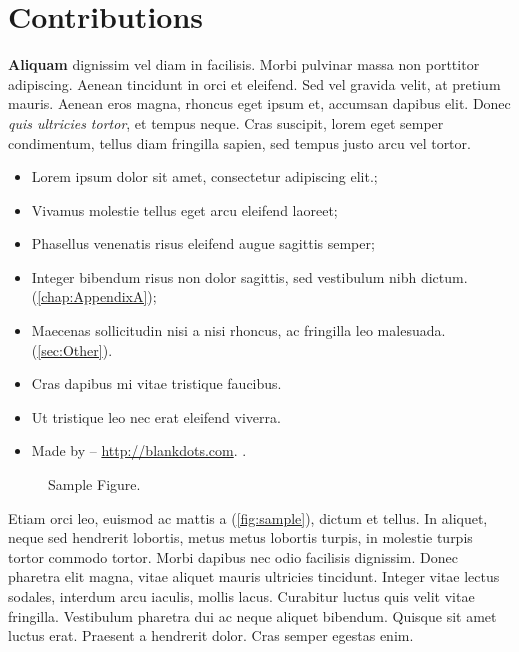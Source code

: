 
\section{Contributions}
\label{sec:ObjectiveContributions}


\textbf{Aliquam} dignissim vel diam in facilisis. Morbi pulvinar massa non porttitor adipiscing. Aenean tincidunt in orci et eleifend. Sed vel gravida velit, at pretium mauris. Aenean eros magna, rhoncus eget ipsum et, accumsan dapibus elit. Donec \textit{quis ultricies tortor}, et tempus neque. Cras suscipit, lorem eget semper condimentum, tellus diam fringilla sapien, sed tempus justo arcu vel tortor. 

\begin{itemize}[noitemsep]
	\item Lorem ipsum dolor sit amet, consectetur adipiscing elit.;
	\item Vivamus molestie tellus eget arcu eleifend laoreet;
	\item Phasellus venenatis risus eleifend augue sagittis semper;
	\item Integer bibendum risus non dolor sagittis, sed vestibulum nibh dictum. (\autoref{chap:AppendixA});
	\item Maecenas sollicitudin nisi a nisi rhoncus, ac fringilla leo malesuada. (\autoref{sec:Other}).
\end{itemize}


\begin{itemize}[noitemsep]
    \item Cras dapibus mi vitae tristique faucibus.
    \item Ut tristique leo nec erat eleifend viverra.
    \item Made by -- \url{http://blankdots.com}.
    .
\end{itemize}

\begin{figure}[h]
		\centering
		{}
		\caption{Sample Figure.}
		\label{fig:sample}
\end{figure}
Etiam orci leo, euismod ac mattis a (\autoref{fig:sample}), dictum et tellus. In aliquet, neque sed hendrerit lobortis, metus metus lobortis turpis, in molestie turpis tortor commodo tortor. Morbi dapibus nec odio facilisis dignissim. Donec pharetra elit magna, vitae aliquet mauris ultricies tincidunt. Integer vitae lectus sodales, interdum arcu iaculis, mollis lacus. Curabitur luctus quis velit vitae fringilla. Vestibulum pharetra dui ac neque aliquet bibendum. Quisque sit amet luctus erat. Praesent a hendrerit dolor. Cras semper egestas enim. 


